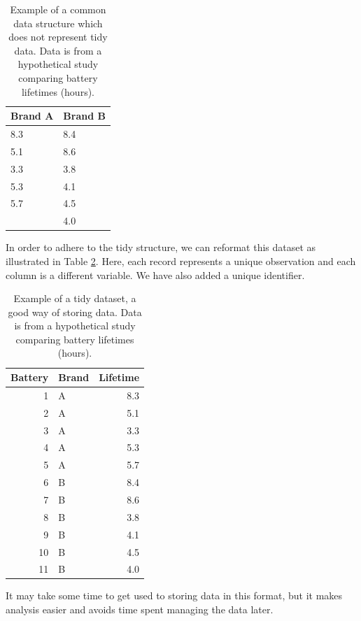\documentclass[
]{book}
\theoremstyle{plain}
\theoremstyle{mydefn}
\theoremstyle{myexmpl}
\theoremstyle{remark}
\begin{document}
\begin{table}

\caption{\label{tab:basics-poor-dataset}Example of a common data structure which does not represent tidy data.  Data is from a hypothetical study comparing battery lifetimes (hours).}
\centering
\begin{tabular}[t]{l|l}
\hline
Brand A & Brand B\\
\hline
8.3 & 8.4\\
\hline
5.1 & 8.6\\
\hline
3.3 & 3.8\\
\hline
5.3 & 4.1\\
\hline
5.7 & 4.5\\
\hline
 & 4.0\\
\hline
\end{tabular}
\end{table}

In order to adhere to the tidy structure, we can reformat this dataset as illustrated in Table \ref{tab:basics-good-dataset}. Here, each record represents a unique observation and each column is a different variable. We have also added a unique identifier.

\begin{table}

\caption{\label{tab:basics-good-dataset}Example of a tidy dataset, a good way of storing data.  Data is from a hypothetical study comparing battery lifetimes (hours).}
\centering
\begin{tabular}[t]{r|l|r}
\hline
Battery & Brand & Lifetime\\
\hline
1 & A & 8.3\\
\hline
2 & A & 5.1\\
\hline
3 & A & 3.3\\
\hline
4 & A & 5.3\\
\hline
5 & A & 5.7\\
\hline
6 & B & 8.4\\
\hline
7 & B & 8.6\\
\hline
8 & B & 3.8\\
\hline
9 & B & 4.1\\
\hline
10 & B & 4.5\\
\hline
11 & B & 4.0\\
\hline
\end{tabular}
\end{table}

It may take some time to get used to storing data in this format, but it makes analysis easier and avoids time spent managing the data later.
\end{document}
